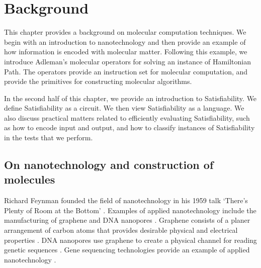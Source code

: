 \chapter{Background}


This chapter provides a background on molecular computation techniques.  We begin with an introduction to nanotechnology and then provide an example of how information is encoded with molecular matter.  Following this example, we introduce Adleman's molecular operators for solving an instance of {\sc Hamiltonian Path}.  The operators provide an instruction set for molecular computation, and provide the primitives for constructing molecular algorithms.

In the second half of this chapter, we provide an introduction to {\sc Satisfiability}.  We define {\sc Satisfiability} as a circuit.  We then view {\sc Satisfiability} as a language.  We also discuss practical matters related to efficiently evaluating {\sc Satisfiability}, such as how to encode input and output, and how to classify instances of {\sc Satisfiability} in the tests that we perform.

\section{On nanotechnology and construction of molecules}

		
	Richard Feynman founded the field of nanotechnology in his 1959 talk `There's Plenty of Room at the Bottom' \cite{feynman1959}.  Examples of applied nanotechnology include the manufacturing of graphene \cite{Stankovich_Dikin_Dommett_Kohlhaas_Zimney_Stach_Piner_Nguyen_Ruoff_2006} and DNA nanopores \cite{dnaTransistorIBMpressrelease}. Graphene consists of a planer arrangement of carbon atoms that provides desirable physical and electrical properties \cite{Stankovich_Dikin_Dommett_Kohlhaas_Zimney_Stach_Piner_Nguyen_Ruoff_2006}.  DNA nanopores use graphene to create a physical channel for reading genetic sequences \cite{Garaj2010}.  Gene sequencing technologies provide an example of applied nanotechnology \cite{Garaj2010, ionTorrent, oxfordNanopore}.  					
		
		
